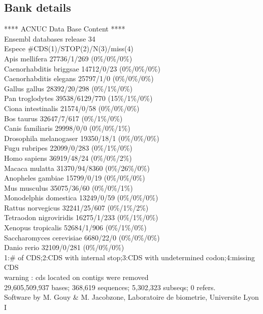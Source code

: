 \documentclass{article}
\begin{document}
\begin{Schunk}
\subsection{Bank details}
            ****     ACNUC Data Base Content      ****   \\
                 Ensembl databases release 34        \\
Espece                                   \#CDS(1)/STOP(2)/N(3)/miss(4)\\
Apis mellifera                          27736/1/269 (0\%/0\%/0\%)\\
Caenorhabditis briggsae                 14712/0/23 (0\%/0\%/0\%)\\
Caenorhabditis elegans                  25797/1/0 (0\%/0\%/0\%)\\
Gallus gallus                           28392/20/298 (0\%/1\%/0\%)\\
Pan troglodytes                         39538/6129/770 (15\%/1\%/0\%)\\
Ciona intestinalis                      21574/0/58 (0\%/0\%/0\%)\\
Bos taurus                              32647/7/617 (0\%/1\%/0\%)\\
Canis familiaris                        29998/0/0 (0\%/0\%/1\%)\\
Drosophila melanogaser                  19350/18/1 (0\%/0\%/0\%)\\
Fugu rubripes                           22099/0/283 (0\%/1\%/0\%)\\
Homo sapiens                            36919/48/24 (0\%/0\%/2\%)\\
Macaca mulatta                          31370/94/8360 (0\%/26\%/0\%)\\
Anopheles gambiae                       15799/0/19 (0\%/0\%/0\%)\\
Mus musculus                            35075/36/60 (0\%/0\%/1\%)\\
Monodelphis domestica                   13249/0/59 (0\%/0\%/0\%)\\
Rattus norvegicus                       32241/25/607 (0\%/1\%/2\%)\\
Tetraodon nigroviridis                  16275/1/233 (0\%/1\%/0\%)\\
Xenopus tropicalis                      52684/1/906 (0\%/1\%/0\%)\\
Saccharomyces cerevisiae                6680/22/0 (0\%/0\%/0\%)\\
Danio rerio                             32109/0/281 (0\%/0\%/0\%)\\
1:\# of CDS;2:CDS with internal stop;3:CDS with undetermined codon;4:missing CDS\\
   warning : cds located on contigs were removed\\
29,605,509,937 bases; 368,619 sequences; 5,302,323 subseqs; 0 refers.\\
Software by M. Gouy \& M. Jacobzone, Laboratoire de biometrie, Universite Lyon I 


\end{Schunk}
\end{document}
